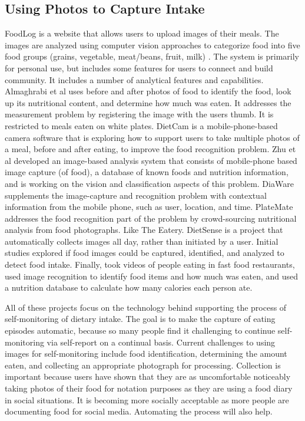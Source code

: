 \subsection{Using Photos to Capture Intake}
FoodLog \citep{aizawa_food_2010, kitamura_foodlog:_2009, de_silva_clustering_2011} is a website that allows users to upload images of their meals. The images are analyzed using computer vision approaches to categorize food into five food groups (grains, vegetable, meat/beans, fruit, milk) \citep{kitamura_image_2010}. The system is primarily for personal use, but includes some features for users to connect and build community. It includes a number of analytical features and capabilities. Almaghrabi et al \citep{almaghrabi_novel_2012} uses before and after photos of food to identify the food, look up its nutritional content, and determine how much was eaten. It addresses the measurement problem by registering the image with the users thumb. It is restricted to meals eaten on white plates. DietCam \citep{fanyu_kong_dietcam:_2011, Kong2011} is a mobile-phone-based camera software that is exploring how to support users to take multiple photos of a meal, before and after eating, to improve the food recognition problem. Zhu et al \citep{zhu_use_2010, bosch_integrated_2011, zhu_image_2010, kim_development_2010} developed an image-based analysis system that consists of mobile-phone based image capture (of food), a database of known foods and nutrition information, and is working on the vision and classification aspects of this problem. DiaWare \citep{shroff_wearable_2008} supplements the image-capture and recognition problem with contextual information from the mobile phone, such as user, location, and time. 
PlateMate \citep{noronha_platemate:_2011} addresses the food recognition part of the problem by crowd-sourcing nutritional analysis from food photographs. Like The Eatery.  DietSense \citep{reddy_image_2007} is a project that automatically collects images all day, rather than initiated by a user. Initial studies explored if food images could be captured, identified, and analyzed to detect food intake. Finally, \citep{wen_wu_fast_2009} took videos of people eating in fast food restaurants, used image recognition to identify food items and how much was eaten, and used a nutrition database to calculate how many calories each person ate. 

All of these projects focus on the technology behind supporting the process of self-monitoring of dietary intake. The goal is to make the capture of eating episodes automatic, because so many people find it challenging to continue self-monitoring via self-report on a continual basis. Current challenges to using images for self-monitoring include food identification, determining the amount eaten, and collecting an appropriate photograph for processing. Collection is important because users have shown that they are as uncomfortable noticeably taking photos of their food for notation purposes as they are using a food diary in social situations. It is becoming more socially acceptable as more people are documenting food for social media. Automating the process will also help. 

